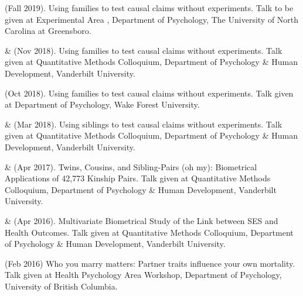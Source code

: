 
\item\meb (Fall 2019). Using families to test causal claims without experiments. Talk to be given at Experimental Area , Department of Psychology, The University of North Carolina at Greensboro. 

\item\meb \& \Joe (Nov 2018). Using families to test causal claims without experiments. Talk given at Quantitative Methods Colloquium, Department of Psychology \& Human Development, Vanderbilt University. 
\item\meb (Oct 2018). Using families to test causal claims without experiments. Talk given at Department of Psychology, Wake Forest University. 
\item\meb \& \Joe (Mar 2018). Using siblings to test causal claims without experiments. Talk given at Quantitative Methods Colloquium, Department of Psychology \& Human Development, Vanderbilt University. 
\item\meb \& \Joe (Apr 2017). Twins, Cousins, and Sibling-Pairs (oh my): Biometrical Applications of 42,773 Kinship Pairs. Talk given at Quantitative Methods Colloquium, Department of Psychology \& Human Development, Vanderbilt University. \href{https://osf.io/uyqwd/}{\color{blue}{https://osf.io/uyqwd/}}
\item\meb \& \Joe (Apr 2016). Multivariate Biometrical Study of the Link between SES and Health Outcomes. Talk given at Quantitative Methods Colloquium, Department of Psychology \& Human Development, Vanderbilt University.
\item \meb (Feb 2016) Who you marry matters: Partner traits influence your own mortality. Talk given at Health Psychology Area Workshop, Department of Psychology, University of British Columbia. \href{https://osf.io/jbf96/}{\color{blue}{https://osf.io/jbf96/}}
